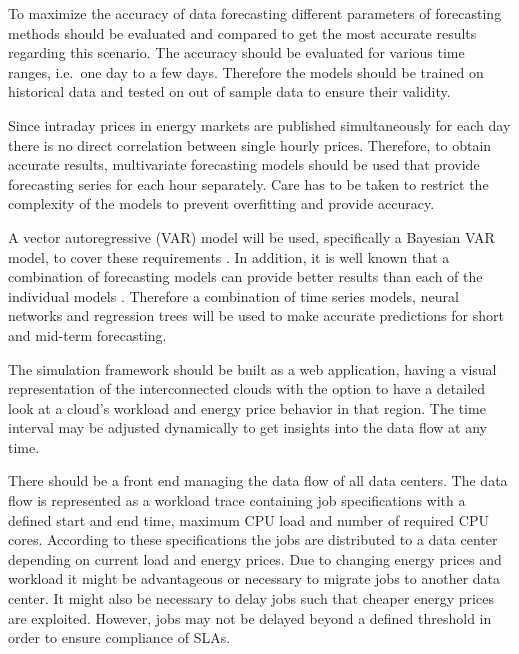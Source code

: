 \documentclass[a4paper]{article}
\begin{document}
To maximize the accuracy of data forecasting different parameters of forecasting methods should be evaluated and compared to get the most accurate results regarding this scenario. The accuracy should be evaluated for various time ranges, i.e.\ one day to a few days. Therefore the models should be trained on historical data and tested on out of sample data to ensure their validity. 

Since intraday prices in energy markets are published simultaneously for each day there is no direct correlation between single hourly prices. Therefore, to obtain accurate results, multivariate forecasting models should be used that provide forecasting series for each hour separately. Care has to be taken to restrict the complexity of the models to prevent overfitting and provide accuracy. 

A vector autoregressive (VAR) model will be used, specifically a Bayesian VAR model, to cover these requirements \cite{raviv2013forecasting}. 
In addition, it is well known that a combination of forecasting models can provide better results than each of the individual models \cite{raviv2013forecasting}. Therefore a combination of time series models, neural networks and regression trees will be used to make accurate predictions for short and mid-term forecasting. 

The simulation framework should be built as a web application, having a visual representation of the interconnected clouds with the option to have a detailed look at a cloud’s workload and energy price behavior in that region. The time interval may be adjusted dynamically to get insights into the data flow at any time.

There should be a front end managing the data flow of all data centers. The data flow is represented as a workload trace containing job specifications with a defined start and end time, maximum CPU load and number of required CPU cores. According to these specifications the jobs are distributed to a data center depending on current load and energy prices. 
Due to changing energy prices and workload it might be advantageous or necessary to migrate jobs to another data center. It might also be necessary to delay jobs such that cheaper energy prices are exploited. However, jobs may not be delayed beyond a defined threshold in order to ensure compliance of SLAs. 

\end{document}
